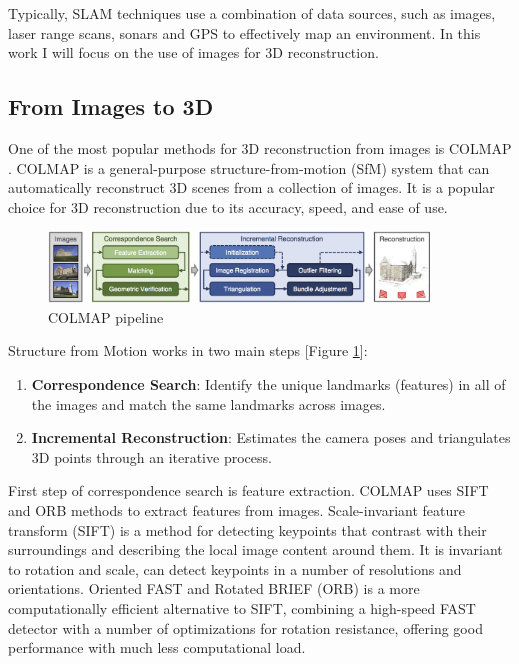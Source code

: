 Typically, SLAM techniques use a combination of data sources, such as
images, laser range scans, sonars and GPS to effectively map an environment.
In this work I will focus on the use of images for 3D reconstruction.

\subsection{From Images to 3D}

One of the most popular methods for 3D reconstruction from images is
COLMAP \cite{colmap}. COLMAP is a general-purpose
structure-from-motion (SfM) \cite{multipleviewgeometry} system that
can automatically reconstruct 3D scenes from a collection of images.
It is a popular choice for 3D reconstruction due to its accuracy,
speed, and ease of use.

\begin{figure}[h]
  \centering
  \includegraphics[width=0.9\textwidth]{images/related-work/COLMAP.png}
  \caption{COLMAP pipeline}
  \label{fig:colmap-pipeline}
\end{figure}

Structure from Motion works in two main steps [Figure
\ref{fig:colmap-pipeline}]:
\begin{enumerate}
  \item \textbf{Correspondence Search}: Identify the unique landmarks
    (features) in all of the images and match the same landmarks across images.
  \item \textbf{Incremental Reconstruction}: Estimates the camera
    poses and triangulates 3D points through an iterative process.
\end{enumerate}

First step of correspondence search is feature extraction. COLMAP
uses SIFT \cite{sift} and ORB \cite{orb} methods to extract features
from images. Scale-invariant feature transform (SIFT) is a method for
detecting keypoints that contrast with their surroundings and
describing the local image content around them. It is invariant to
rotation and scale, can detect keypoints in a number of resolutions
and orientations. Oriented FAST and Rotated BRIEF (ORB) is a more
computationally efficient alternative to SIFT, combining a high-speed
FAST detector with a number of optimizations for rotation resistance,
offering good performance with much less computational load.

